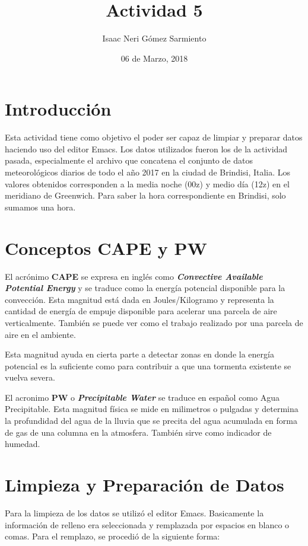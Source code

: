 \documentclass[a4paper]{article}
\title{Actividad 5}
\author{Isaac Neri Gómez Sarmiento}
\date{06 de Marzo, 2018}
\begin{document}
\maketitle


\section{Introducción}
Esta actividad tiene como objetivo el poder ser capaz de limpiar y preparar datos haciendo uso del editor Emacs. Los datos utilizados fueron los de la actividad pasada, especialmente el archivo que concatena el conjunto de datos meteorológicos diarios de todo el año 2017 en la ciudad de Brindisi, Italia. Los valores obtenidos corresponden a la media noche (00z) y medio día (12z) en el meridiano de Greenwich. Para saber la hora correspondiente en Brindisi, solo sumamos una hora. 

\section{Conceptos CAPE y PW}
El acrónimo \textbf{CAPE} se expresa en inglés como \textit{\textbf{Convective Available Potential Energy}} y se traduce como la energía potencial disponible para la convección. Esta magnitud está dada en Joules/Kilogramo y representa la cantidad de energía de empuje disponible para acelerar una parcela de aire verticalmente. También se puede ver como el trabajo realizado por una parcela de aire en el ambiente. 

Esta magnitud ayuda en cierta parte a  detectar zonas en donde la energía potencial es la suficiente como para contribuir a que una tormenta existente se vuelva severa.

El acronimo \textbf{PW} o \textit{\textbf{Precipitable Water}} se traduce en español como Agua Precipitable. Esta magnitud física se mide en milimetros o pulgadas y determina la profundidad del agua de la lluvia que se precita del agua acumulada en forma de gas de una columna en la atmosfera. También sirve como indicador de humedad.



\section{Limpieza y Preparación  de Datos}

Para la limpieza de los datos se utilizó el editor Emacs. Basicamente la información de relleno era seleccionada y remplazada por espacios en blanco o comas. Para el remplazo, se procedió de la siguiente forma:
\end{document}
